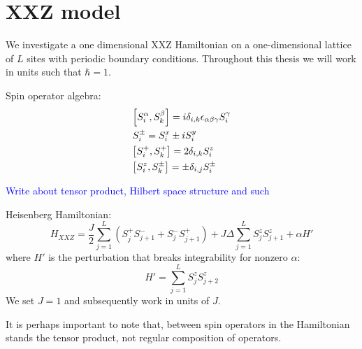 \chapter{XXZ model\label{sec:xxz}}
\thispagestyle{chapterBeginStyle}

We investigate a one dimensional XXZ Hamiltonian on a one-dimensional lattice of \(L\) sites with periodic boundary conditions.
Throughout this thesis we will work in units such that \(\hbar = 1\).

Spin operator algebra:
\begin{align*}
    &\comm{S_{i}^{\alpha}}{S_{k}^{\beta}} = i  \delta_{i,k}\epsilon_{\alpha \beta \gamma} S_{i}^{\gamma}\\
    &S_{i}^{\pm} = \Sx_i \pm i \Sy_i\\
    &\comm{\Sp_i}{\Sp_k} = 2 \delta_{i,k} \Sz_i \\
    &\comm{\Sz_i}{S^{\pm}_k} = \pm \delta_{i,j} S_{i}^{\pm}
\end{align*}

\textcolor{blue}{Write about tensor product, Hilbert space structure and such}

\noindent Heisenberg Hamiltonian:
\begin{equation}
    H_{XXZ} = \frac{J}{2}\sum_{j = 1}^{L}\left( S^{+}_{j} S^{-}_{j+1} + S^{-}_{j}S^{+}_{j+1} \right) + J\Delta\sum_{j = 1}^{L} S^{z}_{j}S^{z}_{j+1}
    + \alpha H'
    \label{eq:HXXZ}
\end{equation}
where \(H'\) is the perturbation that breaks integrability for nonzero \(\alpha\):
\begin{equation}
    H'=\sum_{j = 1}^{L} S^{z}_{j}S^{z}_{j+2}
\end{equation}
We set \(J = 1\) and subsequently work in units of \(J\).

It is perhaps important to note that, between spin operators in the Hamiltonian stands
the tensor product, not regular composition of operators.